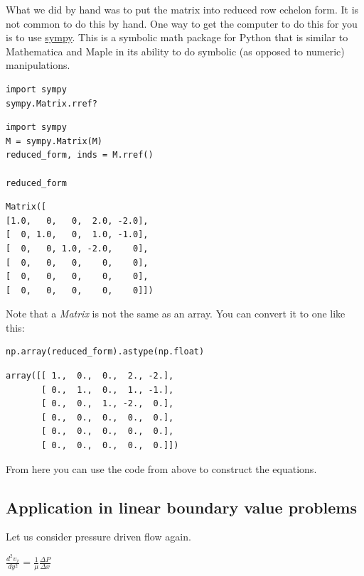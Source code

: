 \documentclass[11pt]{article}
\begin{document}
What we did by hand was to put the matrix into reduced row echelon form. It is not common to do this by hand. One way to get the computer to do this for you is to use \href{https://www.sympy.org/en/index.html}{sympy}. This is a symbolic math package for Python that is similar to Mathematica and Maple in its ability to do symbolic (as opposed to numeric) manipulations.

\begin{verbatim}
import sympy
sympy.Matrix.rref?
\end{verbatim}

\begin{verbatim}
import sympy
M = sympy.Matrix(M)
reduced_form, inds = M.rref()

reduced_form
\end{verbatim}

\begin{verbatim}
Matrix([
[1.0,   0,   0,  2.0, -2.0],
[  0, 1.0,   0,  1.0, -1.0],
[  0,   0, 1.0, -2.0,    0],
[  0,   0,   0,    0,    0],
[  0,   0,   0,    0,    0],
[  0,   0,   0,    0,    0]])
\end{verbatim}

Note that a \emph{Matrix} is not the same as an array. You can convert it to one like this:

\begin{verbatim}
np.array(reduced_form).astype(np.float)
\end{verbatim}

\begin{verbatim}
array([[ 1.,  0.,  0.,  2., -2.],
       [ 0.,  1.,  0.,  1., -1.],
       [ 0.,  0.,  1., -2.,  0.],
       [ 0.,  0.,  0.,  0.,  0.],
       [ 0.,  0.,  0.,  0.,  0.],
       [ 0.,  0.,  0.,  0.,  0.]])
\end{verbatim}

From here you can use the code from above to construct the equations.


\subsection{Application in linear boundary value problems}
\label{sec:org82b020e}

Let us consider pressure driven flow again.

\(\frac{d^2 v_x}{dy^2} = \frac{1}{\mu}\frac{\Delta P}{\Delta x}\)
\end{document}
